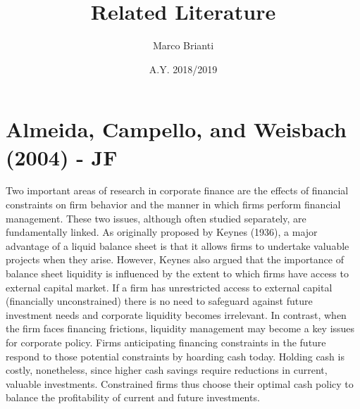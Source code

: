 \documentclass{article}
\title{Related Literature}
\author{Marco Brianti}
\date{A.Y. 2018/2019}
\begin{document}
	\large{

\maketitle

\tableofcontents

\section{Almeida, Campello, and Weisbach (2004) - JF}

Two important areas of research in corporate finance are the effects of financial constraints on firm behavior and the manner in which firms perform financial management. These two issues, although often studied separately, are fundamentally linked.  As originally proposed by Keynes (1936), a major advantage of a liquid balance sheet is that it allows firms to undertake valuable projects when they arise. However, Keynes also argued that the importance of balance sheet liquidity is influenced by the extent to which firms have access to external capital market. If a firm has unrestricted access to external capital (financially unconstrained) there is no need to safeguard against future investment needs and corporate liquidity becomes irrelevant. In contrast, when the firm faces financing frictions, liquidity management may become a key issues for corporate policy. Firms anticipating financing constraints in the future respond to those potential constraints by hoarding cash today. Holding cash is costly, nonetheless, since higher cash savings require reductions in current, valuable investments. Constrained firms thus choose their optimal cash policy to balance the profitability of current and future investments.

}
\end{document}
